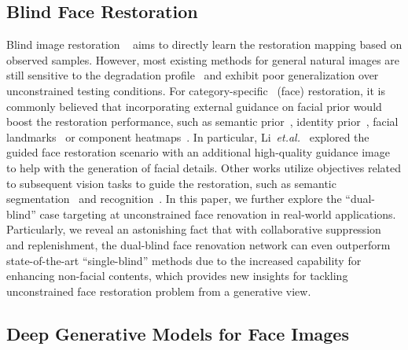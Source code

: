 \documentclass[sigconf]{acmart}
\begin{document}
\subsection{Blind Face Restoration}
Blind image restoration ~\cite{BIR_original} \cite{BIR_1}\cite{BIR_2} aims to directly learn the restoration mapping based on observed samples. However, most existing methods for general natural images are still sensitive to the degradation profile~\cite{BlindIR-wo-prior} and exhibit poor generalization over unconstrained testing conditions.
For category-specific~\cite{CategorySpecificID} (face) restoration, it is commonly believed that incorporating external guidance on facial prior would boost the restoration performance, such as semantic prior~\cite{ComponentSP}, identity prior~\cite{face_hallu_1}, facial landmarks~\cite{SuperFAN}\cite{FSRNet} or component heatmaps~\cite{faceSR_ECCV2018}. In particular, Li~\emph{et.al.}~\cite{BlindFR-ECCV2018} explored the guided face restoration scenario with an additional high-quality guidance image to help with the generation of facial details. Other works utilize objectives related to subsequent vision tasks to guide the restoration, such as semantic segmentation~\cite{whenID_meets_high} and recognition~\cite{Joint_BIR_recog}. In this paper, we further explore the ``dual-blind'' case targeting at unconstrained face renovation in real-world applications. Particularly, we reveal an astonishing fact that with collaborative suppression and replenishment, the dual-blind face renovation network can even outperform state-of-the-art ``single-blind'' methods due to the increased capability for enhancing non-facial contents, which provides new insights for tackling unconstrained face restoration problem from a generative view.

\subsection{Deep Generative Models for Face Images}
\end{document}
